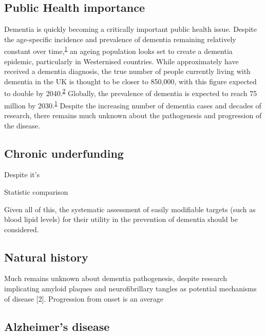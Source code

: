 \documentclass[a4paper, twoside]{templates/ociamthesis}
\begin{document}
\hypertarget{public-health-importance}{%
\subsection{Public Health importance}\label{public-health-importance}}

Dementia is quickly becoming a critically important public health issue. Despite the age-specific incidence and prevalence of dementia remaining relatively constant over time,\textsuperscript{\protect\hyperlink{ref-prince2016}{1}} an ageing population looks set to create a dementia epidemic, particularly in Westernised countries. While approximately have received a dementia diagnosis, the true number of people currently living with dementia in the UK is thought to be closer to 850,000, with this figure expected to double by 2040.\textsuperscript{\protect\hyperlink{ref-baker2019}{2}} Globally, the prevalence of dementia is expected to reach 75 million by 2030.\textsuperscript{\protect\hyperlink{ref-prince2016}{1}} Despite the increasing number of dementia cases and decades of research, there remains much unknown about the pathogenesis and progression of the disease.

\hypertarget{chronic-underfunding}{%
\subsection{Chronic underfunding}\label{chronic-underfunding}}

Despite it's

Statistic comparison

Given all of this, the systematic assessment of easily modifiable targets (such as blood lipid levels) for their utility in the prevention of dementia should be considered.

\hypertarget{natural-history}{%
\subsection{Natural history}\label{natural-history}}

Much remains unknown about dementia pathogenesis, despite research implicating amyloid plaques and neurofibrillary tangles as potential mechanisms of disease {[}2{]}. Progression from onset is an average

\hypertarget{alzheimers-disease}{%
\subsection{Alzheimer's disease}\label{alzheimers-disease}}
\end{document}
